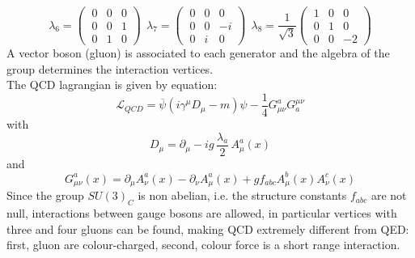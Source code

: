 \begin{equation*}
\lambda_{6} = 
  \begin{pmatrix}
     \ 0 & 0 & 0 \\
     \ 0 & 0 & 1 \\
     \ 0 & 1 & 0
   \end{pmatrix}
\ \ \lambda_{7} = 
  \begin{pmatrix}
     \ 0 & 0 & 0 \\
     \ 0 & 0 & -i \\
     \ 0 & i & 0
   \end{pmatrix}
\ \ \lambda_{8} = \frac{1}{\sqrt{3}} 
  \begin{pmatrix}
     \ 1 & 0 & 0 \\
     \ 0 & 1 & 0 \\
     \ 0 & 0 & -2
   \end{pmatrix}
\end{equation*}
%
A vector boson (gluon) is associated to each generator and the algebra of the group determines the interaction vertices.\\
The QCD lagrangian is given by equation:
%
\begin{equation}
 \label{lQCD}
 \mathcal{L}_{QCD} = \overbar{\psi}(i\gamma^{\mu}D_{\mu}-m)\psi - \frac{1}{4} G^{a}_{\mu\nu}G_{a}^{\mu\nu}
\end{equation}
%
with
%
\begin{equation*}
  D_{\mu} = \partial_{\mu} - i g \, \frac{\lambda_{a}}{2} \, A^{a}_{\mu}(x)
\end{equation*}
%
and
%
\begin{equation*}
  G^{a}_{\mu\nu}(x)=\partial_{\mu}A^{a}_{\nu}(x)-\partial_{\nu}A^{a}_{\mu}(x)+ g f_{abc} A^{b}_{\mu}(x)A^{c}_{\nu}(x)
\end{equation*}
%
Since the group $SU(3)_{C}$ is non abelian, i.e. the structure constants $f_{abc}$ are not null, interactions between gauge bosons are allowed, in particular vertices with three and four gluons can be found, making QCD extremely different from QED: first, gluon are colour-charged, second, colour force is a short range interaction.
%

